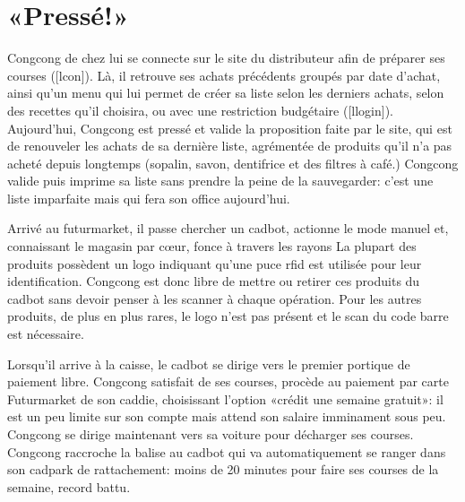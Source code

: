 \section{«Pressé!»}

Congcong de chez lui se connecte sur le site du distributeur afin de préparer ses courses ([lcon]).
Là, il retrouve ses achats précédents groupés par date d'achat, ainsi qu'un menu qui lui permet de créer sa liste selon les derniers achats, selon des recettes qu'il choisira, ou avec une restriction budgétaire ([llogin]). 
Aujourd'hui, Congcong est pressé et valide la proposition faite par le site, qui est de renouveler les achats de sa dernière liste, agrémentée de produits qu'il n'a pas acheté depuis longtemps (sopalin, savon, dentifrice et des filtres à café.)
Congcong valide puis imprime sa liste sans prendre la peine de la sauvegarder: c'est une liste imparfaite mais qui fera son office aujourd'hui.
\par
Arrivé au futurmarket, il passe chercher un cadbot, actionne le mode manuel et, connaissant le magasin par cœur, fonce à travers les rayons 
La plupart des produits possèdent un logo indiquant qu'une puce rfid est utilisée pour leur identification.
Congcong est donc libre de mettre ou retirer ces produits du cadbot sans devoir penser à les scanner à chaque opération.
Pour les autres produits, de plus en plus rares, le logo n'est pas présent et le scan du code barre est nécessaire.
\par
Lorsqu'il arrive à la caisse, le cadbot se dirige vers le premier portique de paiement libre.
Congcong satisfait de ses courses, procède au paiement par carte Futurmarket de son caddie, choisissant l'option «crédit une semaine gratuit»: il est un peu limite sur son compte mais attend son salaire imminament sous peu.
Congcong se dirige maintenant vers sa voiture pour décharger ses courses.
Congcong raccroche la balise au cadbot qui va automatiquement se ranger dans son cadpark de rattachement: moins de 20 minutes pour faire ses courses de la semaine, record battu.

